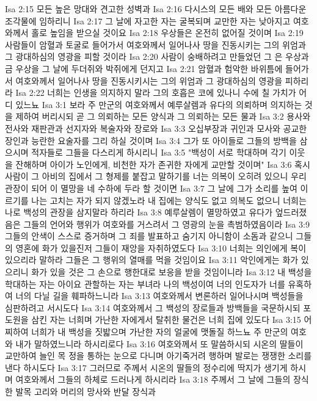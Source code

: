Isa 2:15  모든 높은 망대와 견고한 성벽과
Isa 2:16  다시스의 모든 배와 모든 아름다운 조각물에 임하리니
Isa 2:17  그 날에 자고한 자는 굴복되며 교만한 자는 낮아지고 여호와께서 홀로 높임을 받으실 것이요
Isa 2:18  우상들은 온전히 없어질 것이며
Isa 2:19  사람들이 암혈과 토굴로 들어가서 여호와께서 일어나사 땅을 진동시키는 그의 위엄과 그 광대하심의 영광을 피할 것이라
Isa 2:20  사람이 숭배하려고 만들었던 그 은 우상과 금 우상을 그 날에 두더쥐와 박쥐에게 던지고
Isa 2:21  암혈과 험악한 바위틈에 들어가서 여호와께서 일어나사 땅을 진동시키시는 그의 위엄과 그 광대하심의 영광을 피하리라
Isa 2:22  너희는 인생을 의지하지 말라 그의 호흡은 코에 있나니 수에 칠 가치가 어디 있느뇨
Isa 3:1  보라 주 만군의 여호와께서 예루살렘과 유다의 의뢰하며 의지하는 것을 제하여 버리시되 곧 그 의뢰하는 모든 양식과 그 의뢰하는 모든 물과
Isa 3:2  용사와 전사와 재판관과 선지자와 복술자와 장로와
Isa 3:3  오십부장과 귀인과 모사와 공교한 장인과 능란한 요술자를 그리 하실 것이며
Isa 3:4  그가 또 아이들로 그들의 방백을 삼으시며 적자들로 그들을 다스리게 하시리니
Isa 3:5  "백성이 서로 학대하며 각기 이웃을 잔해하며 아이가 노인에게, 비천한 자가 존귀한 자에게 교만할 것이며"
Isa 3:6  혹시 사람이 그 아비의 집에서 그 형제를 붙잡고 말하기를 너는 의복이 오히려 있으니 우리 관장이 되어 이 멸망을 네 수하에 두라 할 것이면
Isa 3:7  그 날에 그가 소리를 높여 이르기를 나는 고치는 자가 되지 않겠노라 내 집에는 양식도 없고 의복도 없으니 너희는 나로 백성의 관장을 삼지말라 하리라
Isa 3:8  예루살렘이 멸망하였고 유다가 엎드러졌음은 그들의 언어와 행위가 여호와를 거스려서 그 영광의 눈을 촉범하였음이라
Isa 3:9  그들의 안색이 스스로 증거하며 그 죄를 발표하고 숨기지 아니함이 소돔과 같으니 그들의 영혼에 화가 있을진저 그들이 재앙을 자취하였도다
Isa 3:10  너희는 의인에게 복이 있으리라 말하라 그들은 그 행위의 열매를 먹을 것임이요
Isa 3:11  악인에게는 화가 있으리니 화가 있을 것은 그 손으로 행한대로 보응을 받을 것임이니라
Isa 3:12  내 백성을 학대하는 자는 아이요 관할하는 자는 부녀라 나의 백성이여 너의 인도자가 너를 유혹하여 너의 다닐 길을 훼파하느니라
Isa 3:13  여호와께서 변론하러 일어나시며 백성들을 심판하려고 서시도다
Isa 3:14  여호와께서 그 백성의 장로들과 방백들을 국문하시되 포도원을 삼킨 자는 너희며 가난한 자에게서 탈취한 물건은 너희 집에 있도다
Isa 3:15  어찌하여 너희가 내 백성을 짓밟으며 가난한 자의 얼굴에 맷돌질 하느뇨 주 만군의 여호와 내가 말하였느니라 하시리로다
Isa 3:16  여호와께서 또 말씀하시되 시온의 딸들이 교만하여 늘인 목 정을 통하는 눈으로 다니며 아기죽거려 행하며 발로는 쟁쟁한 소리를 낸다 하시도다
Isa 3:17  그러므로 주께서 시온의 딸들의 정수리에 딱지가 생기게 하시며 여호와께서 그들의 하체로 드러나게 하시리라
Isa 3:18  주께서 그 날에 그들의 장식한 발목 고리와 머리의 망사와 반달 장식과
